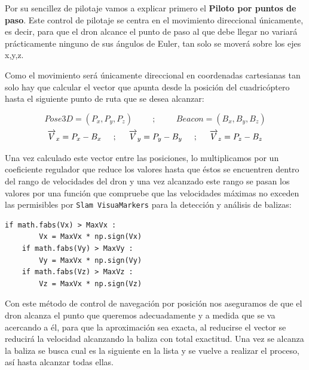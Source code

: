 \hspace{1cm} Por su sencillez de pilotaje vamos a explicar primero el \textbf{Piloto por puntos de paso}. Este control de pilotaje se centra en el movimiento direccional únicamente, es decir, para que el dron alcance el punto de paso al que debe llegar no variará prácticamente ninguno de sus ángulos de Euler, tan solo se moverá sobre los ejes x,y,z.

\hspace{1cm} Como el movimiento será únicamente direccional en coordenadas cartesianas tan solo hay que calcular el vector que apunta desde la posición del cuadricóptero hasta el siguiente punto de ruta que se desea alcanzar: 

\[Pose3D = (P_{x}, P_{y}, P_{z})\hspace{1cm};\hspace{1cm}Beacon = (B_{x}, B_{y}, B_{z})\]
\[\overrightarrow{V}_{x} = P_{x} - B_{x}\hspace{0.5cm};\hspace{0.5cm}\overrightarrow{V}_{y} = P_{y} - B_{y}\hspace{0.5cm};\hspace{0.5cm}\overrightarrow{V}_{z} = P_{z} - B_{z}\]

\hspace{1cm} Una vez calculado este vector entre las posiciones, lo multiplicamos por un coeficiente regulador que reduce los valores hasta que éstos se encuentren dentro del rango de velocidades del dron y una vez alcanzado este rango se pasan los valores por una función que compruebe que las velocidades máximas no exceden las permisibles por \texttt{Slam VisuaMarkers} para la detección y análisis de balizas: 

\begin{lstlisting}[backgroundcolor=\color{gray!15}]
    if math.fabs(Vx) > MaxVx :
        Vx = MaxVx * np.sign(Vx)
    if math.fabs(Vy) > MaxVy :
        Vy = MaxVx * np.sign(Vy)
    if math.fabs(Vz) > MaxVz :
        Vz = MaxVx * np.sign(Vz)        
\end{lstlisting}

\hspace{1cm} Con este método de control de navegación por posición nos aseguramos de que el dron alcanza el punto que queremos adecuadamente y a medida que se va acercando a él, para que la aproximación sea exacta, al reducirse el vector se reducirá la velocidad alcanzando la baliza con total exactitud. Una vez se alcanza la baliza se busca cual es la siguiente en la lista y se vuelve a realizar el proceso, así hasta alcanzar todas ellas.

